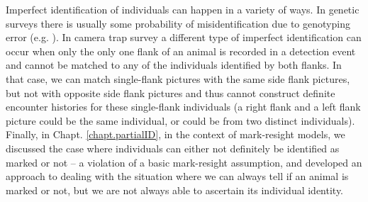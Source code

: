 Imperfect identification of individuals can happen in a variety of
ways. In genetic surveys there is usually some probability of
misidentification due to genotyping error
(e.g. \citet{lukacs_burnham:2005}). In camera trap survey a different
type of imperfect identification can occur when only the only one
flank of an animal is recorded in a detection event and cannot be
matched to any of the individuals identified by both flanks.
In that case, we can match single-flank pictures with the same side
flank pictures, but not with opposite side flank pictures and thus
cannot construct definite encounter histories for these single-flank
individuals (a right flank and a left flank picture could be the same
individual, or could be from two distinct individuals). Finally, in
Chapt. \ref{chapt.partialID}, in the context of mark-resight models,
we discussed the case where individuals can either not definitely be
identified as marked or not -- a violation of a basic mark-resight
assumption, and developed an approach to dealing with the situation
where we can always tell if an animal is marked or not, but we are not
always able to ascertain its individual identity.

